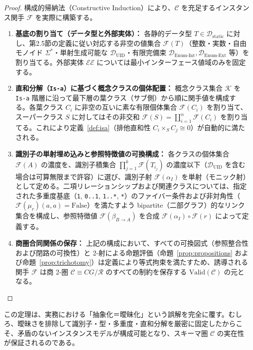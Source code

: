 \documentclass[11pt,a4paper]{ltjsarticle}
\theoremstyle{definition}
\theoremstyle{plain}
\theoremstyle{remark}
\newcommand{\Valid}{\mathrm{Valid}}
\newcommand{\Dstatic}{\mathcal{D}_{\mathrm{static}}}
\newcommand{\Duid}{\mathcal{D}_{\mathrm{UID}}}
\newcommand{\Denumint}{\mathcal{D}_{\mathrm{Enum\text{-}Int}}}
\newcommand{\Denumext}{\mathcal{D}_{\mathrm{Enum\text{-}Ext}}}
\begin{document}
\begin{proof}
構成的帰納法（Constructive Induction）により、$\mathcal{C}$ を充足するインスタンス関手 $\mathcal{F}$ を実際に構築する。
\begin{enumerate}
    \item \textbf{基底の割り当て（データ型と外部実体）：} 各静的データ型 $T \in \Dstatic$ に対し、第2.5節の定義に従い対応する非空の値集合 $\mathcal{F}(T)$（整数・実数・自由モノイド $\Sigma^*$・単射生成可能な $\Duid$・有限完備束 $\Denumint, \Denumext$ 等）を割り当てる。外部実体 $\mathcal{EE}$ については最小インターフェース値域のみを固定する。
    \item \textbf{直和分解（\texttt{Is-a}）に基づく概念クラスの個体配置：} 概念クラス集合 $\mathcal{K}$ を \texttt{Is-a} 階層に沿って最下層の葉クラス（サブ側）から順に関手値を構成する。各葉クラス $C_i$ に非空の互いに素な有限個体集合 $\mathcal{F}(C_i)$ を割り当て、スーパークラス $S$ に対してはその非交和 $\mathcal{F}(S) = \coprod_{i=1}^n \mathcal{F}(C_i)$ を割り当てる。これにより定義~\ref{def:isa}（排他直和性 $C_i \times_S C_j \cong 0$）が自動的に満たされる。
    \item \textbf{識別子の単射埋め込みと参照特徴値の可換構成：} 各クラスの個体集合 $\mathcal{F}(A)$ の濃度を、識別子積集合 $\prod_{j=1}^k \mathcal{F}(T_{i_j})$ の濃度以下（$\Duid$ を含む場合は可算無限まで許容）に選び、識別子射 $\mathcal{F}(\alpha_I)$ を単射（モニック射）として定める。二項リレーションシップおよび関連クラスについては、指定された多重度基底（\texttt{1}, \texttt{0..1}, \texttt{1..*}, \texttt{*}）のファイバー条件および非対角性（$\mathcal{F}(\mu_r)(a, a) = \mathrm{False}$）を満たすよう bipartite（二部グラフ）的なリンク集合を構成し、参照特徴値 $\mathcal{F}(\beta_{B \to A})$ を合成 $\mathcal{F}(\alpha_I) \circ \mathcal{F}(r)$ によって定義する。
    \item \textbf{商圏合同関係の保存：} 上記の構成において、すべての可換図式（参照整合性および閉路の可換性）と 2-射による命題評価（命題~\ref{prop:propositions} および命題~\ref{prop:trichotomy}）は定義により等式拘束を満たすため、誘導される関手 $\mathcal{F}$ は商 2-圏 $\mathcal{C} \equiv CG/\mathcal{R}$ のすべての制約を保存する $\Valid(\mathcal{C})$ の元となる。 \qedhere
\end{enumerate}
\end{proof}

この定理は、実務における「抽象化＝曖昧化」という誤解を完全に覆す。むしろ、曖昧さを排除して識別子・型・多重度・直和分解を厳密に固定したからこそ、矛盾のないインスタンスモデルが構成可能となり、スキーマ圏 $\mathcal{C}$ の実在性が保証されるのである。
\end{document}
